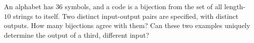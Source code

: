 An alphabet has $36$ symbols, and a code is a bijection from the set of all length-$10$ strings to itself. Two distinct input-output pairs are specified, with distinct outputs. How many bijections agree with them? Can these two examples uniquely determine the output of a third, different input?

